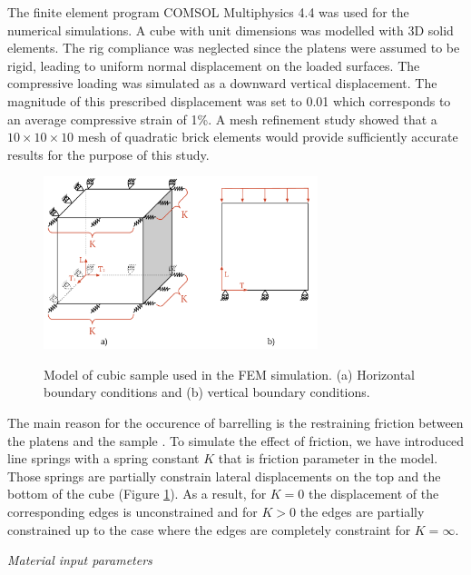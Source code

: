 \documentclass[review]{elsarticle}
\begin{document}
The finite element program COMSOL Multiphysics 4.4 \cite{Comsol} was used for
the numerical simulations.
A cube with unit dimensions was modelled with
3D solid elements.
The rig compliance was neglected since the platens were assumed to be rigid, leading to uniform normal displacement on the loaded surfaces.
The compressive loading was simulated as a downward vertical
displacement. The magnitude of this prescribed displacement was set to 0.01
which corresponds to an average compressive strain of  1\%.
A mesh refinement study showed that a $10\times10\times10$ mesh of quadratic
brick elements would provide sufficiently accurate results for the
purpose of this study.

\begin{figure}[h]
\centering
\includegraphics[width=8cm]{BarellingPaper.pdf}
\label{fig:Barrelling}
\caption{\label{fig:Barrelling} Model of cubic
sample used in the FEM simulation. 
(a) Horizontal boundary conditions and (b) vertical boundary conditions.}
\end{figure}

The main reason for the occurence of barrelling is the restraining friction
between the platens and the sample \cite{Narayanasamy198821, kulkarni1969}. To
simulate the effect of friction, we have introduced line springs with a spring
constant $K$ that is friction parameter in the model. Those springs are partially constrain lateral displacements
on the top and the bottom of the cube (Figure \ref{fig:Barrelling}).  
As a result, for $K=0$ the displacement of the corresponding
edges is unconstrained and for $K>0$ the edges are partially constrained up to
the case where the edges are completely constraint for $K=\infty$.

\begin{description}
\item{\textit{Material input parameters}}
\end{description}
\end{document}
